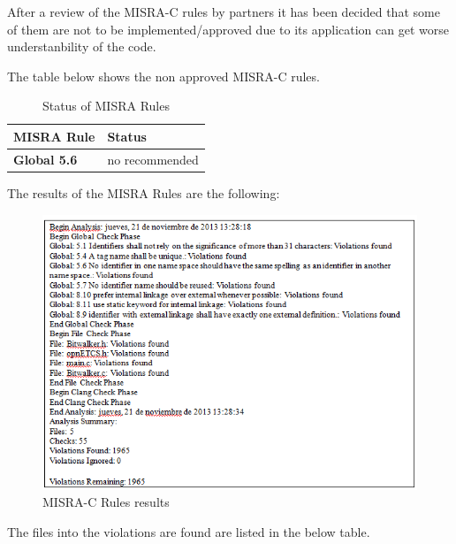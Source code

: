 After a review of the MISRA-C rules by partners it has been decided that some of them are not to be implemented/approved due to its application can get worse understanbility of the code.

The table below shows the non approved MISRA-C rules.

{\footnotesize\sffamily\centering
  \begin{longtable}{||p{}|p{}||}
  \caption{Status of MISRA Rules}\\
    \hline\hline
    \textbf{MISRA Rule} & \textbf{Status} \\
    \hline\hline
    \endhead
    \hline\hline
    \endfoot
    \textbf{Global 5.6}
& no recommended
    \\
    \hline
\end{longtable}}


The results of the MISRA Rules are the following:
\begin{figure}[H]
\centering
\includegraphics{./figures/understand.png}
\caption{MISRA-C Rules results}
\end{figure}

The files into the violations are found are listed in the below table.

